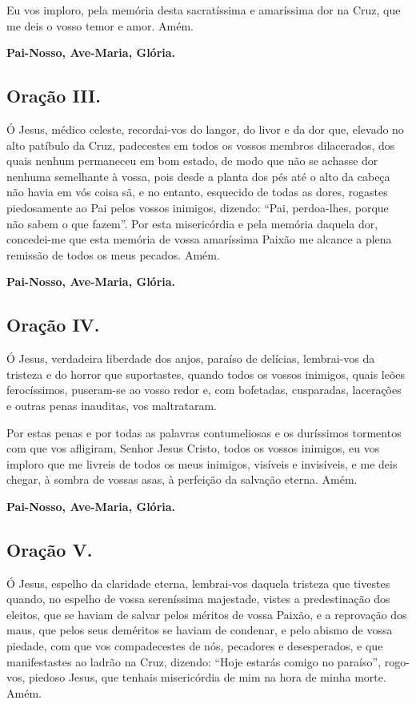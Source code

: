 \documentclass[11pt]{article}
\begin{document}
Eu vos imploro, pela memória desta sacratíssima e amaríssima dor na Cruz, que me deis o vosso temor e amor. Amém. 

\textbf{Pai-Nosso, Ave-Maria, Glória.}

\subsection{Oração III.}
Ó Jesus, médico celeste, recordai-vos do langor, do livor e da dor que, elevado no alto patíbulo da Cruz, padecestes em todos os vossos membros dilacerados, dos quais nenhum permaneceu em bom estado, de modo que não se achasse dor nenhuma semelhante à vossa, pois desde a planta dos pés até o alto da cabeça não havia em vós coisa sã, e no entanto, esquecido de todas as dores, rogastes piedosamente ao Pai pelos vossos inimigos, dizendo: “Pai, perdoa-lhes, porque não sabem o que fazem”. Por esta misericórdia e pela memória daquela dor, concedei-me que esta memória de vossa amaríssima Paixão me alcance a plena remissão de todos os meus pecados. Amém. 

\textbf{Pai-Nosso, Ave-Maria, Glória.}

\subsection{Oração IV.}
Ó Jesus, verdadeira liberdade dos anjos, paraíso de delícias, lembrai-vos da tristeza e do horror que suportastes, quando todos os vossos inimigos, quais leões ferocíssimos, puseram-se ao vosso redor e, com bofetadas, cusparadas, lacerações e outras penas inauditas, vos maltrataram.

Por estas penas e por todas as palavras contumeliosas e os duríssimos tormentos com que vos afligiram, Senhor Jesus Cristo, todos os vossos inimigos, eu vos imploro que me livreis de todos os meus inimigos, visíveis e invisíveis, e me deis chegar, à sombra de vossas asas, à perfeição da salvação eterna. Amém. 

\textbf{Pai-Nosso, Ave-Maria, Glória.}

\subsection{Oração V.}
Ó Jesus, espelho da claridade eterna, lembrai-vos daquela tristeza que tivestes quando, no espelho de vossa sereníssima majestade, vistes a predestinação dos eleitos, que se haviam de salvar pelos méritos de vossa Paixão, e a reprovação dos maus, que pelos seus deméritos se haviam de condenar, e pelo abismo de vossa piedade, com que vos compadecestes de nós, pecadores e desesperados, e que manifestastes ao ladrão na Cruz, dizendo: “Hoje estarás comigo no paraíso”, rogo-vos, piedoso Jesus, que tenhais misericórdia de mim na hora de minha morte. Amém. 
\end{document}
